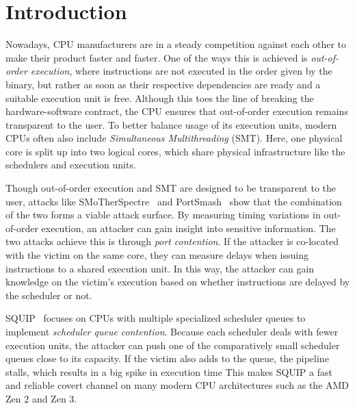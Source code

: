 \documentclass[11pt,
  titlepage=false,
]{scrreprt}
\begin{document}
\clearpage



\chapter{Introduction}
\label{ch:introduction}

Nowadays, CPU manufacturers are in a steady competition against each other to make their product faster and faster.
One of the ways this is achieved is \textit{out-of-order execution}, where instructions are not executed in the order given by the binary, but rather as soon as their respective dependencies are ready and a suitable execution unit is free.
Although this toes the line of breaking the hardware-software contract, the CPU ensures that out-of-order execution remains transparent to the user.
To better balance usage of its execution units, modern CPUs often also include \textit{Simultaneous Multithreading} (SMT).
Here, one physical core is split up into two logical cores, which share physical infrastructure like the schedulers and execution units.

Though out-of-order execution and SMT are designed to be transparent to the user, attacks like
SMoTherSpectre~\cite{Bhattacharyya2019} and PortSmash~\cite{Aldaya2019port} show that the combination of the two forms a viable attack surface.
By measuring timing variations in out-of-order execution, an attacker can gain insight into sensitive information.
The two attacks achieve this is through \textit{port contention}.
If the attacker is co-located with the victim on the same core, they can measure delays when issuing instructions to a shared execution unit.
In this way, the attacker can gain knowledge on the victim's execution based on whether instructions are delayed by the scheduler or not.

SQUIP~\cite{squip} focuses on CPUs with multiple specialized scheduler queues to implement \textit{scheduler queue contention}.
Because each scheduler deals with fewer execution units, the attacker can push one of the comparatively small scheduler queues close to its capacity.
If the victim also adds to the queue, the pipeline stalls, which results in a big spike in execution time
This makes SQUIP a fast and reliable covert channel on many modern CPU architectures such as the AMD Zen 2 and Zen 3.
\end{document}
